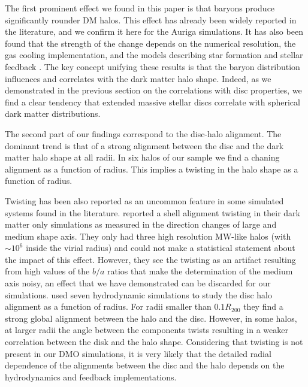 \documentclass[usenatbib]{mnras}
\begin{document}
The first prominent effect we found in this paper is that  baryons produce
significantly rounder DM halos. This effect has already been  widely 
reported in the literature, and we confirm it here for the Auriga simulations.
It has also been found that the strength of the change depends on the
numerical resolution, the gas cooling implementation, and the
models describing star formation and stellar feedback
\citep{Bailin05,Debattista08, Bryan13, Butsky16, Chua19, Artale19}.  
The key concept unifying these results is that the baryon distribution
influences and correlates with the dark matter halo shape. 
Indeed, as we demonstrated in the previous section on the correlations
with disc properties, we find a clear tendency that extended
massive stellar discs correlate with spherical dark matter
distributions.  

The second part of our findings correspond to the disc-halo alignment.
The dominant trend is that of a strong alignment between
the disc and the dark matter halo shape at all radii. 
In six halos of our sample we find a chaning alignment as a function
of radius.
This implies a twisting in the halo shape as a function of
radius.

Twisting has been also reported as an uncommon feature in some 
simulated systems found in the literature. 
\cite{JingSuto02} reported a shell alignment twisting in their dark
matter only simulations as measured in the direction changes of large
and medium shape axis. 
They only had three high resolution MW-like halos (with
$\sim 10^{6}$ inside the virial radius) and could not make a
statistical statement about the impact of this effect.
However, they see the twisting as an artifact resulting from high
values  of the $b/a$ ratios that make the determination of the medium
axis noisy, an effect that we have demonstrated can be discarded for
our simulations.
\cite{Bailin05} used seven hydrodynamic simulations to study the disc
halo alignment as a function of radius.
For radii smaller than $0.1R_{200}$ they find a strong global
alignment between the halo and the disc.
However, in some halos, at larger radii the angle between the
components twists resulting in a weaker correlation between the disk
and the halo shape. 
Considering that twisting is not present in our DMO simulations, it is
very likely that the detailed radial dependence of the alignments
between the disc and the halo depends on the hydrodynamics and
feedback implementations. 
\end{document}
